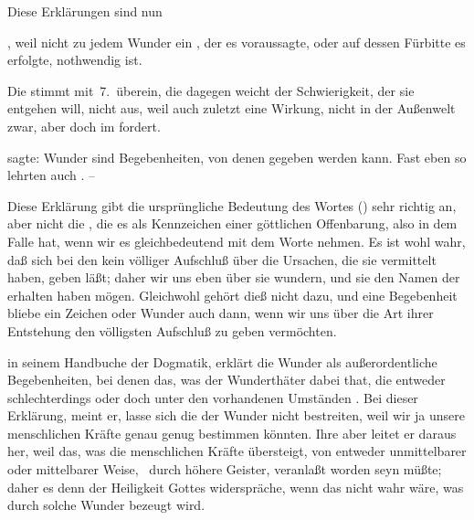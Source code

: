 Diese Erklärungen sind nun
\begin{aufzb}
\item {}, weil nicht zu jedem Wunder ein , der es voraussagte, oder auf dessen Fürbitte es erfolgte, nothwendig ist.~
\item Die  stimmt mit \no\,7.\ überein, die  dagegen weicht der Schwierigkeit, der sie entgehen will, nicht aus, weil auch  zuletzt eine  Wirkung, nicht in der Außenwelt zwar, aber doch im  fordert.
\end{aufzb}
\begin{aufza}\setcounter{enumi}{9}
\item {} sagte: Wunder sind Begebenheiten, von denen  gegeben werden kann. Fast eben so lehrten auch . --
\end{aufza}\par
Diese Erklärung gibt die ursprüngliche Bedeutung des Wortes  () sehr richtig an, aber nicht die , die es als Kennzeichen einer göttlichen Offenbarung, also in dem Falle hat, wenn wir es gleichbedeutend mit dem Worte  nehmen. Es ist wohl wahr, daß sich bei den  kein völliger Aufschluß über die Ursachen, die sie vermittelt haben, geben läßt; daher wir uns eben über sie wundern, und sie den Namen der  erhalten haben mögen. Gleichwohl gehört dieß nicht  dazu, und eine Begebenheit bliebe ein Zeichen oder Wunder auch dann, wenn wir uns über die Art ihrer Entstehung den völligsten Aufschluß zu geben vermöchten.
\begin{aufza}\setcounter{enumi}{10}
\item {} in seinem Handbuche der Dogmatik, erklärt die Wunder als außerordentliche Begebenheiten, bei denen das, was der Wunderthäter dabei that, die  entweder schlechterdings oder doch unter den vorhandenen Umständen . Bei dieser Erklärung, meint er, lasse sich die  der Wunder nicht bestreiten, weil wir ja unsere menschlichen Kräfte genau genug bestimmen könnten. Ihre  aber leitet er daraus her, weil das, was die menschlichen Kräfte übersteigt, von  entweder unmittelbarer oder mittelbarer Weise, \zB\ durch höhere Geister, veranlaßt worden seyn müßte; daher es denn der Heiligkeit Gottes widerspräche, wenn das nicht wahr wäre, was durch solche Wunder bezeugt wird.
\end{aufza}\par
